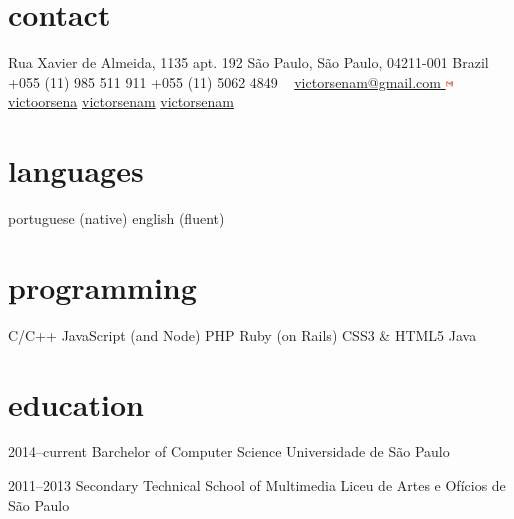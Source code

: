 \documentclass[]{friggeri-cv} %
\begin{document}


\begin{aside} %
\section{contact}
Rua Xavier de Almeida, 1135 apt. 192
São Paulo, São Paulo, 04211-001
Brazil
~
+055 (11) 985 511 911
+055 (11) 5062 4849
~
\href{mailto:victorsenam@gmail.com}{victorsenam@gmail.com \includegraphics[width=0.2cm]{img/gmail.png}}
\href{http://facebook.com/victoorsena}{victoorsena}
\href{http://github.com/victorsenam}{victorsenam}
\href{http://codeforces.com/profiles/victorsenam}{victorsenam}
\section{languages}
portuguese (native)
english (fluent)
\section{programming}
C/C++
JavaScript (and Node)
PHP
Ruby (on Rails)
CSS3 \& HTML5
Java
\end{aside}


\section{education}

\begin{entrylist}


\entry
{2014--current}
{Barchelor {\normalfont of Computer Science}}
{Universidade de São Paulo}

\entry
{2011--2013}
{Secondary Technical School {\normalfont of Multimedia}}
{Liceu de Artes e Ofícios de São Paulo}


\end{entrylist}
\end{document}
